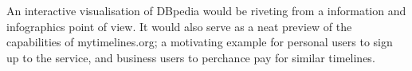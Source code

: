 An interactive visualisation of DBpedia would be riveting from a information 
and infographics point of view. It would also serve as a neat preview of the 
capabilities of mytimelines.org; a motivating example for personal users to 
sign up to the service, and business users to perchance pay for similar 
timelines.
